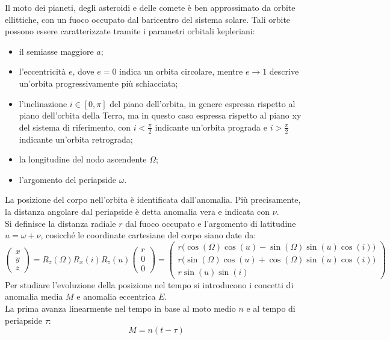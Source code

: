 \documentclass[12pt,a4paper,openright,twoside]{book}
\begin{document}
Il moto dei pianeti, degli asteroidi e delle comete è ben approssimato da orbite ellittiche, con un fuoco occupato dal baricentro del sistema solare. Tali orbite possono essere caratterizzate tramite i parametri orbitali kepleriani:
\begin{itemize}
\item il semiasse maggiore $a$;
\item l'eccentricità $e$, dove $e=0$ indica un orbita circolare, mentre $e\to 1$ descrive un'orbita progressivamente più schiacciata;
\item l'inclinazione $i\in[0,\pi]$ del piano dell'orbita, in genere espressa rispetto al piano dell'orbita della Terra, ma in questo caso espressa rispetto al piano xy del sistema di riferimento, con $i<\frac{\pi}{2}$ indicante un'orbita prograda e $i>\frac{\pi}{2}$ indicante un'orbita retrograda;
\item la longitudine del nodo ascendente $\Omega$;
\item l'argomento del periapside $\omega$.
\end{itemize}
La posizione del corpo nell'orbita è identificata dall'anomalia. Più precisamente, la distanza angolare dal periapside è detta anomalia vera e indicata con $\nu$. \\
Si definisce la distanza radiale $r$ dal fuoco occupato e l'argomento di latitudine $u=\omega+\nu$, cosicché le coordinate cartesiane del corpo siano date da:
\begin{equation}
\begin{pmatrix}x \\ y \\ z\end{pmatrix}=R_z(\Omega)R_x(i)R_z(u)\begin{pmatrix}r \\ 0 \\ 0\end{pmatrix}=\begin{pmatrix}r\bigl(\cos(\Omega)\cos(u)-\sin(\Omega)\sin(u)\cos(i)\bigr) \\ r\bigl(\sin(\Omega)\cos(u)+\cos(\Omega)\sin(u)\cos(i)\bigr) \\ r\sin(u)\sin(i)\end{pmatrix}
\end{equation}
Per studiare l'evoluzione della posizione nel tempo si introducono i concetti di anomalia media $M$ e anomalia eccentrica $E$. \\
La prima avanza linearmente nel tempo in base al moto medio $n$ e al tempo di periapside $\tau$:
\begin{equation}
M=n(t-\tau)
\end{equation}
\end{document}
